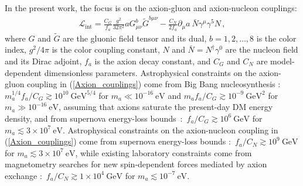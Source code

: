 In the present work, the focus is on the axion-gluon and axion-nucleon couplings:
\begin{align}
\label{Axion_couplings}
\mathcal{L}_{\textrm{int}} = \frac{C_G}{f_a} \frac{g^2}{32\pi^2} a G^{b}_{\mu \nu} \tilde{G}^{b \mu \nu}  - \frac{C_N}{2f_a} \partial_\mu a ~ \bar{N} \gamma^\mu \gamma^5 N \, ,
\end{align}
where $G$ and $\tilde{G}$ are the gluonic field tensor and its dual, $b=1,2,\ldots,8$ is the  color index, $g^2 / 4 \pi$ is the color coupling constant, {\color{black}$N$ and $\bar{N} = N^\dagger \gamma^0$ are the nucleon field and its Dirac adjoint,} $f_a$ is the axion decay constant, and $C_G$ and {\color{black}$C_N$} are model-dependent dimensionless parameters.
Astrophysical constraints on the axion-gluon coupling in (\ref{Axion_couplings}) come from Big Bang nucleosynthesis \cite{Blum2014,StadnikThesis,Stadnik2015D}:~$m_a^{1/4} f_a / C_G \gtrsim 10^{10}~\textrm{GeV}^{5/4}$ for $m_a \ll 10^{-16}~\textrm{eV}$ and $m_a f_a / C_G \gtrsim 10^{-9}~\textrm{GeV}^{2}$ for $m_a \gg 10^{-16}~\textrm{eV}$, assuming that axions saturate the present-day DM energy density,
and from supernova energy-loss bounds~\cite{Graham2013,Raffelt1990Review}:~$f_a / C_G \gtrsim 10^6 ~\textrm{GeV}$ for $m_a \lesssim 3 \times 10^{7}~\textrm{eV}$.
{\color{black}Astrophysical constraints on the axion-nucleon coupling in (\ref{Axion_couplings}) come from supernova energy-loss bounds \cite{Raffelt1990Review,Raffelt2008LNP}:~$f_a / C_N \gtrsim 10^9 ~\textrm{GeV}$ for $m_a \lesssim 3 \times 10^{7}~\textrm{eV}$, while existing laboratory constraints come from magnetometry searches for new spin-dependent forces mediated by axion exchange \cite{Romalis2009_NF}:~$f_a / C_N \gtrsim 1 \times 10^4 ~\textrm{GeV}$ for $m_a \lesssim 10^{-7}~\textrm{eV}$. }

